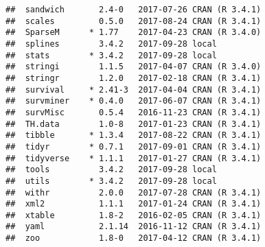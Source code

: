 \documentclass[]{book}
\theoremstyle{definition}
\theoremstyle{definition}
\theoremstyle{definition}
\theoremstyle{remark}
\begin{document}
\begin{verbatim}
##  sandwich       2.4-0   2017-07-26 CRAN (R 3.4.1)
##  scales         0.5.0   2017-08-24 CRAN (R 3.4.1)
##  SparseM      * 1.77    2017-04-23 CRAN (R 3.4.0)
##  splines        3.4.2   2017-09-28 local         
##  stats        * 3.4.2   2017-09-28 local         
##  stringi        1.1.5   2017-04-07 CRAN (R 3.4.0)
##  stringr        1.2.0   2017-02-18 CRAN (R 3.4.1)
##  survival     * 2.41-3  2017-04-04 CRAN (R 3.4.1)
##  survminer    * 0.4.0   2017-06-07 CRAN (R 3.4.1)
##  survMisc       0.5.4   2016-11-23 CRAN (R 3.4.1)
##  TH.data        1.0-8   2017-01-23 CRAN (R 3.4.1)
##  tibble       * 1.3.4   2017-08-22 CRAN (R 3.4.1)
##  tidyr        * 0.7.1   2017-09-01 CRAN (R 3.4.1)
##  tidyverse    * 1.1.1   2017-01-27 CRAN (R 3.4.1)
##  tools          3.4.2   2017-09-28 local         
##  utils        * 3.4.2   2017-09-28 local         
##  withr          2.0.0   2017-07-28 CRAN (R 3.4.1)
##  xml2           1.1.1   2017-01-24 CRAN (R 3.4.1)
##  xtable         1.8-2   2016-02-05 CRAN (R 3.4.1)
##  yaml           2.1.14  2016-11-12 CRAN (R 3.4.1)
##  zoo            1.8-0   2017-04-12 CRAN (R 3.4.1)
\end{verbatim}


\end{document}
